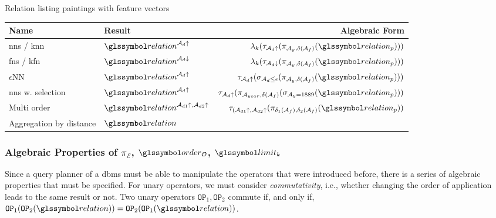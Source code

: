 \begin{example}[label=example:rel_painting_w_features]{Relation listing paintings with feature vectors}{}
    \begin{center}
        \begin{tabular}{||l l r ||} 
         \hline
         Name & Result & Algebraic Form \\
         \hline\hline
         \acrshort{nns} / \acrshort{knn} & $\relation^{\mathcal{A}_d\uparrow}$ & $\lambda_k (\tau_{\mathcal{A}_d\uparrow} ( \pi_{\mathcal{A}_{y}, \delta(\mathcal{A}_{f})}  ( \relation_p)))$  \\ 
         \hline
         \acrshort{fns} / \acrshort{kfn}& $\relation^{\mathcal{A}_d\downarrow}$ & $\lambda_k (\tau_{\mathcal{A}_d\downarrow} ( \pi_{\mathcal{A}_{y}, \delta(\mathcal{A}_{f})}  ( \relation_p)))$   \\
         \hline
         $\epsilon$NN~\cite{Giangreco:2018Database} & $\relation^{\mathcal{A}_d\uparrow}$ & $\tau_{\mathcal{A}_d\uparrow} ( \sigma_{\mathcal{A}_d \leq \epsilon} ( \pi_{\mathcal{A}_{y}, \delta(\mathcal{A}_{f})} ( \relation_p)) )$  \\
         \hline
         \acrshort{nns} w. selection & $\relation^{\mathcal{A}_d\uparrow}$ &  $\tau_{\mathcal{A}_d\uparrow} ( \pi_{\mathcal{A}_{year}, \delta(\mathcal{A}_{f})} ( \sigma_{\mathcal{A}_{y} = 1889} ( \relation_p)) )$\\
         \hline
         Multi order & $\relation^{\mathcal{A}_{d1}\uparrow,\mathcal{A}_{d2}\uparrow}$ & $\tau_{(\mathcal{A}_{d1}\uparrow,\mathcal{A}_{d2}\uparrow} ( \pi_{\delta_1(\mathcal{A}_{f}), \delta_2(\mathcal{A}_{f})}  ( \relation_p))$ \\ 
         \hline
         Aggregation by distance & $\relation$ & \\ 
         \hline
        \end{tabular}
    \end{center}

\end{example}

\subsubsection{Algebraic Properties of  \texorpdfstring{$\pi_{\mathcal{E}}$}{Pi}, \texorpdfstring{$\order_{\mathcal{O}}$}{Tau}, \texorpdfstring{$\limit_k$}{Lambda}}

Since a query planner of a \acrshort{dbms} must be able to manipulate the operators that were introduced before, there is a series of algebraic properties that must be specified. For unary operators, we must consider \emph{commutativity}, i.e., whether changing the order of application leads to the same result or not. Two unary operators $\mathtt{OP}_1,\mathtt{OP}_2$ commute if, and only if, $ \mathtt{OP}_1 (\mathtt{OP}_2 ( \relation)) = \mathtt{OP}_2 (\mathtt{OP}_1 (\relation))$.

